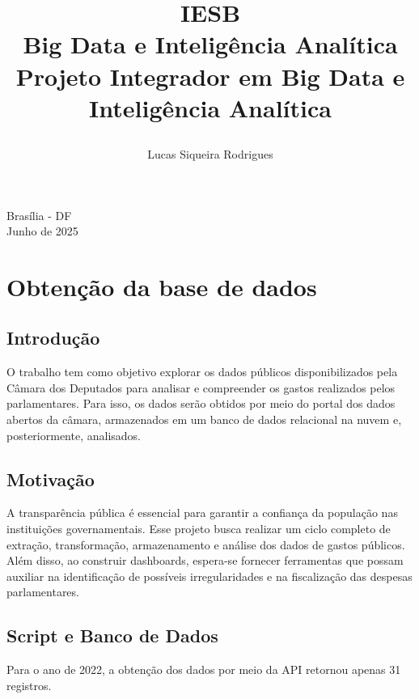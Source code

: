 \documentclass[12pt, a4paper]{article}
\title{
    \textbf{IESB} \\
    \large Big Data e Inteligência Analítica \\
    \vspace{10cm}
    \textbf{Projeto Integrador em Big Data e Inteligência Analítica}
    \author{Lucas Siqueira Rodrigues}
    \date{}
}
\begin{document}
\begin{titlepage} 
    \maketitle
    \begin{center}
        \vspace{\fill}
        Brasília - DF \\
        Junho de 2025
    \end{center}
\end{titlepage}

\section{Obtenção da base de dados}
\subsection{Introdução}
O trabalho tem como objetivo explorar os dados públicos disponibilizados pela Câmara dos Deputados para analisar e compreender os gastos realizados pelos parlamentares. Para isso, os dados serão obtidos por meio do portal dos dados abertos da câmara\cite{dados_abertos}, armazenados em um banco de dados relacional na nuvem e, posteriormente, analisados.

\subsection{Motivação}
A transparência pública é essencial para garantir a confiança da população nas instituições governamentais. Esse projeto busca realizar um ciclo completo de extração, transformação, armazenamento e análise dos dados de gastos públicos. Além disso, ao construir dashboards, espera-se fornecer ferramentas que possam auxiliar na identificação de possíveis irregularidades e na fiscalização das despesas parlamentares.


\subsection{Script e Banco de Dados}
Para o ano de 2022, a obtenção dos dados por meio da API\cite{dados_abertos} retornou apenas 31 registros.
\end{document}
